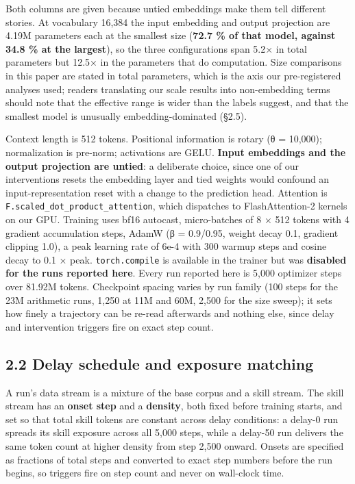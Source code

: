 \documentclass[11pt]{article}
\begin{document}
Both columns are given because untied embeddings make them tell different stories. At
vocabulary 16,384 the input embedding and output projection are 4.19M parameters each at the
smallest size (\textbf{72.7 \% of that model, against 34.8 \% at the largest}), so the three
configurations span 5.2× in total parameters but 12.5× in the parameters that do computation.
Size comparisons in this paper are stated in total parameters, which is the axis our
pre-registered analyses used; readers translating our scale results into non-embedding terms
should note that the effective range is wider than the labels suggest, and that the smallest
model is unusually embedding-dominated (§2.5).

Context length is 512 tokens. Positional information is rotary (θ = 10,000); normalization is
pre-norm; activations are GELU. \textbf{Input embeddings and the output projection are untied}: a deliberate choice, since one of our interventions resets the embedding layer and tied
weights would confound an input-representation reset with a change to the prediction head.
Attention is \texttt{F.scaled\_dot\_product\_attention}, which dispatches to FlashAttention-2 kernels
on our GPU. Training uses bf16 autocast, micro-batches of 8 × 512 tokens with 4 gradient
accumulation steps, AdamW (β = 0.9/0.95, weight decay 0.1, gradient clipping 1.0), a peak
learning rate of 6e-4 with 300 warmup steps and cosine decay to 0.1 × peak. \texttt{torch.compile}
is available in the trainer but was \textbf{disabled for the runs reported here}. Every run
reported here is 5,000 optimizer steps over 81.92M tokens. Checkpoint spacing varies by run
family (100 steps for the 23M arithmetic runs, 1,250 at 11M and 60M, 2,500 for the size
sweep); it sets how finely a trajectory can be re-read afterwards and nothing else, since
delay and intervention triggers fire on exact step count.

\subsection{2.2 Delay schedule and exposure matching}\label{delay-schedule-and-exposure-matching}

A run's data stream is a mixture of the base corpus and a skill stream. The skill stream has
an \textbf{onset step} and a \textbf{density}, both fixed before training starts, and set so that total
skill tokens are constant across delay conditions: a delay-0 run spreads its skill exposure
across all 5,000 steps, while a delay-50 run delivers the same token count at higher density
from step 2,500 onward. Onsets are specified as fractions of total steps and converted to
exact step numbers before the run begins, so triggers fire on step count and never on
wall-clock time.
\end{document}
